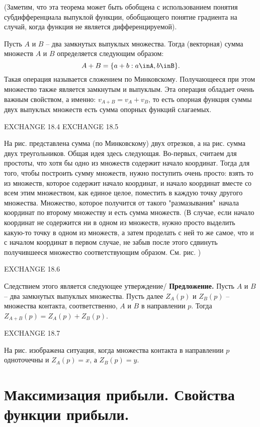 (Заметим, что эта теорема может быть обобщена с использованием понятия субдифференциала
выпуклой функции, обобщающего понятие градиента на случай, когда функция не является дифференцируемой).

Пусть $A$ и $B$ -- два замкнутых выпуклых множества. Тогда (векторная) сумма множеств
$A$ и $B$ определяется следующим образом:
$$A+B=\{a+b: a\inA, b\inB\}.$$
Такая операция называется сложением по Минковскому. Получающееся при этом множество
также является замкнутым и выпуклым. Эта операция обладает очень важным свойством, а именно:
$v_{A+B}=v_A+v_B$, то есть опорная функция суммы двух выпуклых множеств есть сумма опорных
функций слагаемых.

EXCHANGE 18.4
EXCHANGE 18.5

На рис.   представлена сумма (по Минковскому) двух отрезков, а на рис.     сумма двух треугольников.
Общая идея здесь следующая. Во-первых, считаем для простоты, что хотя бы одно из множеств
содержит начало координат. Тогда для того, чтобы построить сумму множеств, нужно поступить
очень просто: взять то из множеств, которое содержит начало координат, и начало координат
вместе со всем этим множеством, как единое целое, поместить в каждую точку другого множества.
Множество, которое получится от такого "размазывания"\, начала координат по второму множеству
и есть сумма множеств. (В случае, если начало координат не содержится ни в одном из множеств,
нужно просто выделить какую-то точку в одном из множеств, а затем проделать с ней то же
самое, что и с началом координат в первом случае, не забыв после этого сдвинуть получившееся множество
соответствующим образом. См. рис.    )

EXCHANGE 18.6


Следствием этого является следующее утверждение/
\textbf{Предложение.} Пусть $A$ и $B$ -- два замкнутых выпуклых множества. Пусть далее
$Z_A(p)$ и $Z_B(p)$ -- множества контакта, соответственно, $A$ и $B$ в направлении $p$.
Тогда $Z_{A+B}(p)=Z_A(p)+Z_B(p)$.


EXCHANGE 18.7

На рис.       изображена ситуация, когда множества контакта в направлении $p$ одноточечны
и $Z_A(p)=x$, а $Z_B(p)=y$.

\section*{Максимизация прибыли. Свойства функции прибыли.}

